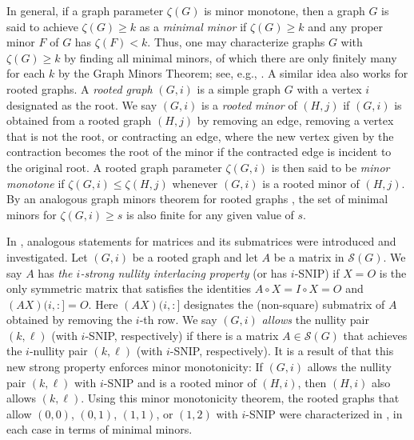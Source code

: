 \documentclass{article}
\theoremstyle{definition}
\newcommand{\mptn}{\mathcal{S}} %
\begin{document}
In general, if a graph parameter $\zeta(G)$ is minor monotone, then a graph $G$ is said to achieve $\zeta(G) \ge k$ as a \emph{minimal minor} if $\zeta(G) \geq k$ and any proper minor $F$ of $G$ has $\zeta(F) < k$.  Thus, one may characterize graphs $G$ with $\zeta(G) \geq k$ by finding all minimal minors, of which there are only finitely many for each $k$ by the Graph Minors Theorem; see, e.g., \cite{DiestelGT}. A similar idea also works for rooted graphs.  A \emph{rooted graph} $(G,i)$ is a simple graph $G$ with a vertex $i$ designated as the root.  We say $(G,i)$ is a \emph{rooted minor} of $(H,j)$ if $(G,i)$ is obtained from a rooted graph $(H,j)$ by removing an edge, removing a vertex that is not the root, or contracting an edge, where the new vertex given by the contraction becomes the root of the minor if the contracted edge is incident to the original root.  A rooted graph parameter $\zeta(G,i)$ is then said to be \emph{minor monotone} if $\zeta(G,i) \leq \zeta(H,j)$ whenever $(G,i)$ is a rooted minor of $(H,j)$.  By an analogous graph minors theorem for rooted graphs \cite{RS10}, the set of minimal minors for $\zeta(G, i) \geq s$ is also finite for any given value of $s$.

In \cite{SNIP}, analogous statements for matrices and its submatrices were introduced and investigated.   Let $(G,i)$ be a rooted graph and let $A$ be a matrix in $\mptn(G)$.  We say $A$ has \emph{the $i$-strong nullity interlacing property} (or has $i$-SNIP) if $X = O$ is the only symmetric matrix that satisfies the identities $A\circ X = I\circ X = O$ and $(AX)(i,:] = O$.  Here $(AX)(i,:]$ designates the (non-square) submatrix of $A$ obtained by removing the $i$-th row.  We say $(G,i)$ \emph{allows} the nullity pair $(k,\ell)$ (with $i$-SNIP, respectively) if there is a matrix $A\in\mptn(G)$ that achieves the $i$-nullity pair $(k,\ell)$ (with $i$-SNIP, respectively).
It is a result of \cite{SNIP} that this new strong property enforces minor monotonicity:
If $(G,i)$ allows the nullity pair $(k,\ell)$ with $i$-SNIP and is a rooted minor of $(H,i)$, then $(H,i)$ also allows $(k,\ell)$.
Using this minor monotonicity theorem, the rooted graphs that allow $(0,0)$, $(0,1)$, $(1,1)$, or $(1,2)$ with $i$-SNIP were characterized in \cite{SNIP}, in each case in terms of minimal minors.  
\end{document}
